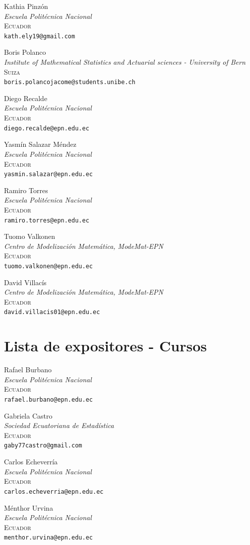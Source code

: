 \documentclass[a5paper,doc,10pt,noapacite]{apa6}
\newcommand{\EPN}{Escuela Politécnica Nacional}
\newcommand{\Modematb}{Centro de Modelización Matemática, ModeMat-EPN}
\newcommand{\vsb}{\vspace{0.75\baselineskip}}
\newcommand{\Speaker}[4]{\vsb #1 \\ \emph{#2} \\ \textsc{#3}\\ \texttt{#4}}
\begin{document}
{\begin{spacing}{1.2}
\begin{multicols*}{2}
\Speaker{Kathia Pinzón}{\EPN}{Ecuador}{kath.ely19@gmail.com}

\Speaker{Boris Polanco}{Institute of Mathematical Statistics and Actuarial sciences - University of Bern}{Suiza}{boris.polancojacome@students.unibe.ch}

\Speaker{Diego Recalde}{\EPN}{Ecuador}{diego.recalde@epn.edu.ec}

\Speaker{Yasmín Salazar Méndez}{\EPN}{Ecuador}{yasmin.salazar@epn.edu.ec}

\Speaker{Ramiro Torres}{\EPN}{Ecuador}{ramiro.torres@epn.edu.ec}

\Speaker{Tuomo Valkonen}{\Modematb}{Ecuador}{tuomo.valkonen@epn.edu.ec}

\Speaker{David Villacís}{\Modematb}{Ecuador}{david.villacis01@epn.edu.ec}		





\end{multicols*}
\end{spacing}










\section{Lista de expositores - Cursos}
\footnotesize

\begin{spacing}{1.2}
\begin{multicols*}{2}

\Speaker{Rafael Burbano}{\EPN}{Ecuador}{rafael.burbano@epn.edu.ec}

\Speaker{Gabriela Castro}{Sociedad Ecuatoriana de Estadística}{Ecuador}{gaby77castro@gmail.com}

\Speaker{Carlos Echeverría}{\EPN}{Ecuador}{carlos.echeverria@epn.edu.ec}

\Speaker{Ménthor Urvina}{\EPN}{Ecuador}{menthor.urvina@epn.edu.ec}


\end{multicols*}
\end{spacing}





\newpage
}
\end{document}
